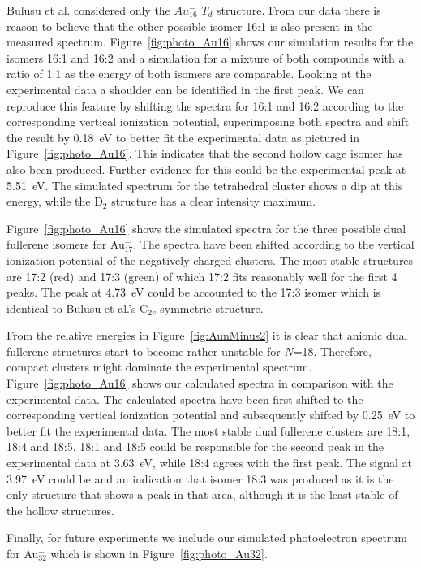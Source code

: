Bulusu et al. considered only the $Au_{16}^-$ $T_d$ structure. From our data
there is reason to believe that the other possible isomer 16:1 is also present
in the measured spectrum. Figure~\ref{fig:photo_Au16} shows our simulation
results for the isomers 16:1 and 16:2 and a simulation for a mixture of both
compounds with a ratio of 1:1 as the energy of both isomers are comparable. 
Looking at the experimental data a shoulder can
be identified in the first peak. We can reproduce this feature by shifting the
spectra for 16:1 and 16:2 according to the corresponding vertical ionization
potential, superimposing both spectra and shift the result by 0.18~eV to better
fit the experimental data as pictured in Figure~\ref{fig:photo_Au16}. This
indicates that the second hollow cage isomer has also been produced.
Further evidence for this could be the experimental peak at 5.51~eV. The
simulated spectrum for the tetrahedral cluster shows a dip at this energy,
while the D$_2$ structure has a clear intensity maximum. 

Figure~\ref{fig:photo_Au16} shows the simulated spectra for the three possible
dual fullerene isomers for Au$_{17}^-$. The spectra have been shifted according
to the vertical ionization potential of the negatively charged clusters. The most
stable structures are 17:2 (red) and 17:3 (green) of which 17:2 fits reasonably
well for the first 4 peaks. The peak at 4.73~eV could be accounted to the 17:3
isomer which is identical to Bulusu et al.'s C$_{2v}$ symmetric structure.

From the relative energies in Figure~\ref{fig:AunMinus2} it is clear that
anionic dual fullerene structures start to become rather unstable for $N$=18.
Therefore, compact clusters might dominate the experimental spectrum.
Figure~\ref{fig:photo_Au16} shows our calculated spectra in comparison with the
experimental data. The calculated spectra have been first shifted to the
corresponding vertical ionization potential and subsequently shifted by 0.25~eV
to better fit the experimental data. The most stable dual fullerene clusters are
18:1, 18:4 and 18:5. 18:1 and 18:5 could be responsible for the second peak in
the experimental data at 3.63~eV, while 18:4 agrees with the first peak. The
signal at 3.97~eV could be and an indication that isomer 18:3 was produced as it is
the only structure that shows a peak in that area, although it is the least
stable of the hollow structures.

Finally, for future experiments we include our simulated photoelectron spectrum
for Au$_{32}^-$ which is shown in Figure~\ref{fig:photo_Au32}. 

